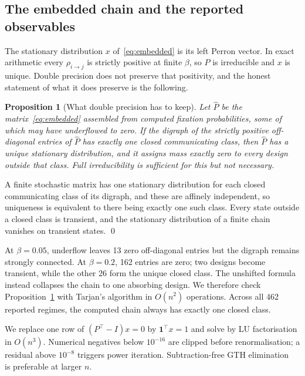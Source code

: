 \documentclass[a4paper,fleqn]{cas-sc}
\newtheorem{proposition}[theorem]{Proposition}
\begin{document}
\subsection{The embedded chain and the reported observables}
\label{sec:observables}

The stationary distribution $x$ of~\eqref{eq:embedded} is its left Perron
vector. In exact arithmetic every $\rho_{i\to j}$ is strictly positive at finite
$\beta$, so $P$ is irreducible and $x$ is unique. Double precision does not
preserve that positivity, and the honest statement of what it does preserve is
the following.

\begin{proposition}[What double precision has to keep]
\label{prop:closed}
Let $\hat P$ be the matrix~\eqref{eq:embedded} assembled from computed fixation
probabilities, some of which may have underflowed to zero. If the digraph of
the strictly positive off-diagonal entries of $\hat P$ has exactly one closed
communicating class, then $\hat P$ has a unique stationary distribution, and it
assigns mass exactly zero to every design outside that class. Full
irreducibility is sufficient for this but not necessary.
\end{proposition}

\begin{pf}
A finite stochastic matrix has one stationary distribution for each closed
communicating class of its digraph, and these are affinely independent, so
uniqueness is equivalent to there being exactly one such class. Every state
outside a closed class is transient, and the stationary distribution of a
finite chain vanishes on transient states.
\qed
\end{pf}

At $\beta=0.05$, underflow leaves 13 zero off-diagonal entries but the digraph
remains strongly connected. At $\beta=0.2$, 162 entries are zero; two designs
become transient, while the other 26 form the unique closed class. The unshifted
formula instead collapses the chain to one absorbing design. We therefore check
Proposition~\ref{prop:closed} with Tarjan's algorithm in $O(n^2)$ operations.
Across all 462 reported regimes, the computed chain always has exactly one
closed class.

We replace one row of $(P^\top-I)x=0$ by $\mathbf 1^\top x=1$ and solve by LU
factorisation in $O(n^3)$. Numerical negatives below $10^{-16}$ are clipped
before renormalisation; a residual above $10^{-8}$ triggers power iteration.
Subtraction-free GTH elimination~\citep{grassmann1985gth} is preferable at
larger $n$.
\end{document}
